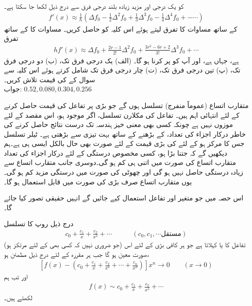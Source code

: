  کو یک درجی اور مزید زیادہ بلند درجی فرق سے درج ذیل لکھا جا سکتا ہے۔ 
\begin{align*}
f'(x)\approx \frac{1}{h}(\Delta f_0-\frac{1}{2}\Delta^2 f_0+\frac{1}{3}\Delta^3f_0-\frac{1}{4}\Delta^4 f_0+-\cdots)
\end{align*}
 کے ساتھ مساوات  کا  تفرق لیتے ہوئے اس کلیہ کو حاصل کریں۔ مساوات  کا  کے ساتھ تفرق
\begin{align*}
hf'(x)\approx \Delta f_0+\frac{2r-1}{2!}\Delta^2 f_0+\frac{3r^2-6r+2}{3!}\Delta^3f_0+\cdots
\end{align*}
ہے،  جہاں  ہے، اور آپ کو  پر کرنا ہو گا۔ (الف) یک درجی فرق تک، (ب) دو درجی فرق تک، (پ) تین درجی فرق تک، (ت) چار درجی فرق تک  شامل کرتے ہوئے  اس کلیہ سے  سوال  کے  کی قیمت تلاش کریں۔ \\
جواب:\quad
$0.52, 0.080, 0.304, 0.256$

متقارب اتساع (عموماً منفرج) تسلسل ہوں گے جو بڑی  پر تفاعل  کی قیمت حاصل کرنے کے  لئے  انتہائی اہم ہیں۔ تفاعل  کی مکلارن تسلسل، اگر موجود ہو،  اس مقصد کے لئے موزوں نہیں ہے چونکہ  کسی بھی معنی خیز ہندسہ تک درست نتائج حاصل کرنے کی خاطر درکار اجزاء کی تعداد،  کے بڑھنے کے ساتھ بہت تیزی سے بڑھتی ہے۔ ٹیلر تسلسل جس کا مرکز  ہو کے لئے  کی بڑی قیمت کے لئے صورت بھی حال بالکل ایسی ہی ہے۔ہم دیکھیں گے کہ  جتنا بڑا ہو، کسی مخصوص درستگی کے لئے درکار اجزاء کی تعداد متقارب اتساع کی صورت میں اتنی ہی کم ہو گی۔دوسری جانب متقارب اتساع سے زیادہ درستگی حاصل نہیں ہو گی اور چھوٹی  کی صورت میں درستگی مزید کم ہو گی۔یوں متقارب اتساع صرف بڑی  کی صورت میں قابل استعمال ہو گا۔

اس حصہ میں جو متغیر اور تفاعل استعمال کیے جائیں گے انہیں حقیقی تصور کیا جائے گا۔

درج ذیل روپ کا تسلسل 
\begin{align*}
c_0+\frac{c_1}{x}+\frac{c_2}{x^2}+\cdots\quad\quad\quad (c_0,c_1,\cdots \text{مستقل})
\end{align*}
(جو ضروری نہیں کہ کسی بھی  کے لئے مرتکز ہو) تفاعل  کا   یا  کہلاتا ہے جو ہر کافی بڑی  کے لئے اس صورت معین ہو گا جب ہر مقررہ  کے لئے درج ذیل مطمئن ہو،
\begin{align}\label{مساوات_اعدادی_متقارب_الف}
[f(x)-(c_0+\frac{c_1}{x}+\frac{c_2}{x^2}+\cdots+\frac{c_n}{x^n})]x^n\to 0  \quad \quad (x\to 0) 
\end{align}
اور تب ہم
\begin{align*}
f(x) \sim c_0+\frac{c_1}{x}+\frac{c_2}{x^2}+\cdots
\end{align*}
لکھتے ہیں۔

